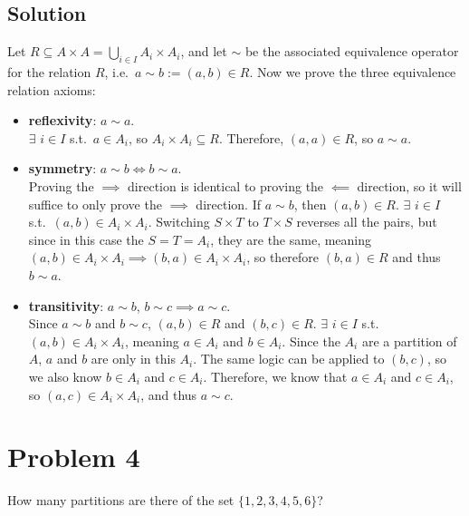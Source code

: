 \documentclass[fleqn]{article}
\begin{document}
        \subsection{Solution}
        Let $R \subseteq A \times A = \bigcup\limits_{i \in I} A_i \times A_i$, and let $\sim$ be the associated equivalence operator for the relation $R$, i.e.\ $a \sim b := (a, b) \in R$.  Now we prove the three equivalence relation axioms:
        \begin{itemize}
            
            \item \textbf{reflexivity}: $a \sim a$. \\
            $\exists$ $i \in I$ s.t.\ $a \in A_i$, so $A_i \times A_i \subseteq R$.  Therefore, $(a, a) \in R$, so $a \sim a$.
            
            \item \textbf{symmetry}: $a \sim b \iff b \sim a$. \\
            Proving the $\implies$ direction is identical to proving the $\impliedby$ direction, so it will suffice to only prove the $\implies$ direction.  If $a \sim b$, then $(a, b) \in R$.  $\exists$ $i \in I$ s.t.\ $(a, b) \in A_i \times A_i$.  Switching $S \times T$ to $T \times S$ reverses all the pairs, but since in this case the $S = T = A_i$, they are the same, meaning $(a, b) \in A_i \times A_i \implies (b, a) \in A_i \times A_i$, so therefore $(b, a) \in R$ and thus $b \sim a$.
            
            \item \textbf{transitivity}: $a \sim b$, $b \sim c \implies a \sim c$. \\
            Since $a \sim b$ and $b \sim c$, $(a, b) \in R$ and $(b, c) \in R$.  $\exists$ $i \in I$ s.t.\ $(a, b) \in A_i \times A_i$, meaning $a \in A_i$ and $b \in A_i$.  Since the $A_i$ are a partition of $A$, $a$ and $b$ are only in this $A_i$.  The same logic can be applied to $(b, c)$, so we also know $b \in A_i$ and $c \in A_i$.  Therefore, we know that $a \in A_i$ and $c \in A_i$, so $(a, c) \in A_i \times A_i$, and thus $a \sim c$.
        \end{itemize}
    
    \pagebreak
    
    \section{Problem 4}
    How many partitions are there of the set $\{1, 2, 3, 4, 5, 6\}$?
        
\end{document}
